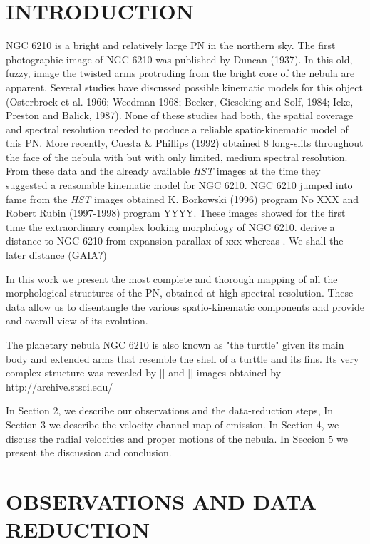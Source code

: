 \documentclass{aa}
\newcommand{\nii}{[\ion{N}{2}]}
\newcommand{\oiii}{[\ion{O}{3}]}
\begin{document}
\section{INTRODUCTION}
\label{sec:introduction}
NGC 6210 is a bright and relatively large PN in the northern sky. The first photographic image of NGC 6210 was published by Duncan (1937). In this old, fuzzy, image the twisted arms protruding from the bright core of the nebula are apparent. Several studies have discussed possible kinematic models for this object \citepp({Osterbrock et al. 1966; Weedman 1968; Becker, Gieseking and Solf, 1984; Icke, Preston and Balick, 1987}). None of these studies had both, the spatial coverage and spectral resolution needed to produce a reliable spatio-kinematic model of this PN. 
More recently, Cuesta \& Phillips (1992) obtained 8 long-slits throughout the face of the nebula with but with only limited, medium spectral resolution. From these data and the already available {\it HST} images at the time they suggested a  reasonable kinematic model for NGC 6210. NGC 6210 jumped into fame from the {\it HST} images obtained K. Borkowski (1996) program No XXX and Robert Rubin (1997-1998) program YYYY. These images showed for the first time the extraordinary complex looking morphology of NGC 6210.  derive a distance to NGC 6210 from expansion parallax of xxx whereas . We shall the later distance (GAIA?)

In this work we present the most complete and thorough mapping of all the morphological structures of the PN, obtained at high spectral resolution. These data allow us to 
disentangle the various spatio-kinematic components and provide and overall view of its evolution.

The planetary nebula NGC 6210 is also known as "the turttle" given its main body and extended arms that resemble the shell of a turttle and its fins. Its very complex structure was revealed by  \oiii{} and \nii{}{\HST} images obtained by http://archive.stsci.edu/

In Section 2, we describe our observations and the data-reduction steps, In Section 3 we describe the velocity-channel map of emission. In Section 4, we discuss the radial velocities and proper motions of the nebula. In Seccion 5 we present the discussion and conclusion.


\section{OBSERVATIONS AND DATA REDUCTION}
\label{sec:observations}
\end{document}
